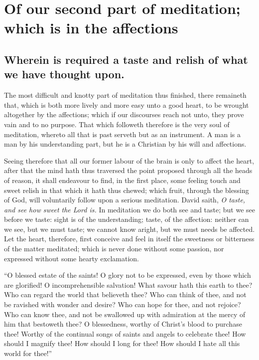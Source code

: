\chapter{Of our second part of meditation; which is in the affections}
\section{Wherein is required a taste and relish of what we have thought upon.}

The most difficult and knotty part of meditation thus finished, there remaineth that, which is both more lively and more easy unto a good heart, to be wrought altogether by the affections; which if our discourses reach not unto, they prove vain and to no purpose. That which followeth therefore is the very soul of meditation, whereto all that is past serveth but as an instrument. A man is a man by his understanding part, but he is a Christian by his will and affections. 

Seeing therefore that all our former labour of the brain is only to affect the heart, after that the mind hath thus traversed the point proposed through all the heads of reason, it shall endeavour to find, in the first place, some feeling touch and sweet relish in that which it hath thus chewed; which fruit, through the blessing of God, will voluntarily follow upon a serious meditation. David saith, \emph{O taste, and see how sweet the Lord is.} In meditation we do both see and taste; but we see before we taste: sight is of the understanding; taste, of the affection: neither can we see, but we must taste; we cannot know aright, but we must needs be affected. Let the heart, therefore, first conceive and feel in itself the sweetness or bitterness of the matter meditated; which is never done without some passion, nor expressed without some hearty exclamation. 

``O blessed estate of the saints! O glory not to be expressed, even by those which are glorified! O incomprehensible salvation! What savour hath this earth to thee? Who can regard the world that believeth thee? Who can think of thee, and not be ravished with wonder and desire? Who can hope for thee, and not rejoice? Who can know thee, and not be swallowed up with admiration at the mercy of him that bestoweth thee? O blessedness, worthy of Christ's blood to purchase thee! Worthy of the continual songs of saints and angels to celebrate thee! How should I magnify thee! How should I long for thee! How should I hate all this world for thee!''
